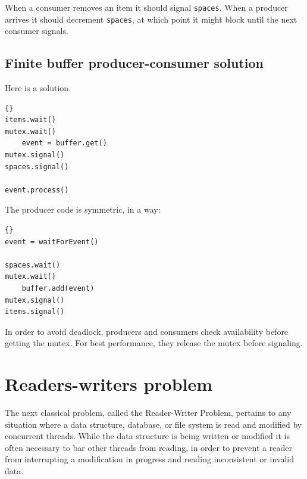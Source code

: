 \documentclass{book}
\newcommand{\clearemptydoublepage}{\newpage\cleardoublepage}
\begin{document}
When a consumer removes an item it should signal {\tt spaces}.
When a producer arrives it should decrement {\tt spaces}, at
which point it might block until the next consumer signals.


\clearemptydoublepage
\subsection{Finite buffer producer-consumer solution}

Here is a solution.

\begin{latin}
\begin{latin}
\begin{lstlisting}[title={Finite buffer consumer solution}]{}
items.wait()
mutex.wait()
    event = buffer.get()
mutex.signal()
spaces.signal()

event.process()
\end{lstlisting}
\end{latin}
\end{latin}

The producer code is symmetric, in a way:

\begin{latin}
\begin{latin}
\begin{lstlisting}[title={Finite buffer producer solution}]{}
event = waitForEvent()

spaces.wait()
mutex.wait()
    buffer.add(event)
mutex.signal()
items.signal()
\end{lstlisting}
\end{latin}
\end{latin}

In order to avoid deadlock, producers and consumers check
availability before getting the mutex.  For best performance,
they release the mutex before signaling.


\section{Readers-writers problem} 

The next classical problem, called the Reader-Writer Problem, pertains
to any situation where a data structure, database, or file system is
read and modified by concurrent threads.  While the data structure is
being written or modified it is often necessary to bar other threads
from reading, in order to prevent a reader from interrupting a
modification in progress and reading inconsistent or invalid data.
\end{document}
